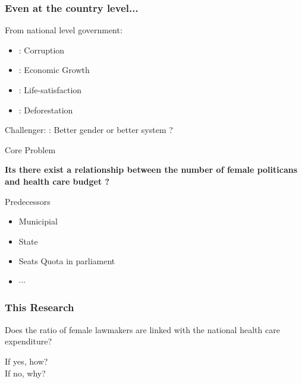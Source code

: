 \documentclass[12pt]{beamer}
\begin{document}
\begin{frame}
	\frametitle{Even at the country level...}
	\begin{center}
		From national level government:\pause
			\end{center}
		\begin{itemize}
			\item {}: Corruption
			\item {}: Economic Growth
			\item {}: Life-satisfaction
			\item {}: Deforestation
		\end{itemize}\pause
Challenger:
: Better gender or better system ?
\end{frame}

\begin{frame}{Core Problem}
\pause%
\begin{center}
\alert{\textbf{Its there exist a relationship between the number of female politicans and health care budget ?}}\pause
\end{center}

Predecessors 
\begin{itemize}
\item Municipial \cite{Funk2018}
\item State \cite{Irma2011}
\item Seats Quota in parliament \cite{Chen2010}
\item $\cdots$
\end{itemize}
\end{frame}

\begin{frame}
	\frametitle{This Research}
	\begin{center}
		Does the ratio of female lawmakers are linked with the national health care expenditure?\\
	\end{center}
	\begin{center}
	If yes, how? \\
	If no, why?
	\end{center}
\end{frame}





\end{document}
